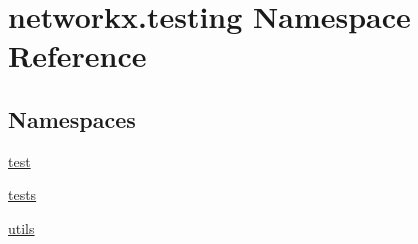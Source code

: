 \hypertarget{namespacenetworkx_1_1testing}{}\section{networkx.\+testing Namespace Reference}
\label{namespacenetworkx_1_1testing}
\subsection*{Namespaces}
\begin{DoxyCompactItemize}
\item 
 \hyperlink{namespacenetworkx_1_1testing_1_1test}{test}
\item 
 \hyperlink{namespacenetworkx_1_1testing_1_1tests}{tests}
\item 
 \hyperlink{namespacenetworkx_1_1testing_1_1utils}{utils}
\end{DoxyCompactItemize}
